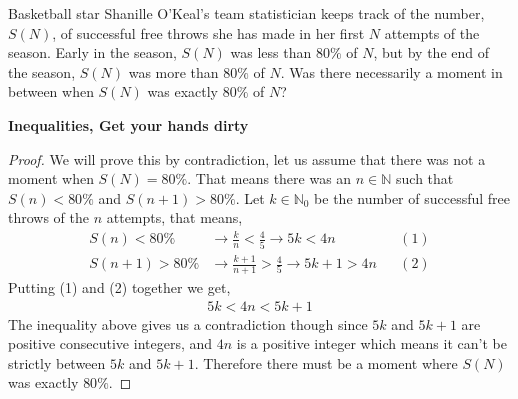 \documentclass[11pt]{article}
\newenvironment{problem}[2][Problem\!]{\begin{trivlist}
\item[\hskip \labelsep {\bfseries #1}\hskip \labelsep {\bfseries #2}]}{\end{trivlist}}
\newcommand{\nn}{\mathbb N}   %
\begin{document}
\begin{tcolorbox}
    \begin{problem} {IC | 12/01 | PP 36}
        Basketball star Shanille O'Keal's team statistician keeps track of the number, $S(N)$, of successful free throws she has made in her first $N$ attempts of the season. Early in the season, $S(N)$ was less than $80\%$ of $N$, but by the end of the season, $S(N)$ was more than $80\%$ of $N$. Was there necessarily a moment in between when $S(N)$ was exactly $80\%$ of $N$?
    \end{problem}
    \textbf{Inequalities, Get your hands dirty}
\end{tcolorbox}
\begin{proof}
    We will prove this by contradiction, let us assume that there was not a moment when $S(N) = 80\%$. That means there was an $n \in \nn$ such that $S(n) < 80\%$ and $S(n +1) > 80\%$. Let $k\in \nn_0$ be the number of successful free throws of the $n$ attempts, that means,
    \begin{align*}
        S(n) < 80\% &\rightarrow \frac{k}{n} < \frac{4}{5} \rightarrow 5k < 4n &&(1)\\
        S(n+1) > 80\% &\rightarrow \frac{k+1}{n+1} > \frac{4}{5} \rightarrow  5k +1 > 4n && (2) 
    \end{align*}
    Putting (1) and (2) together we get,
    \begin{align*}
        5k < 4n < 5k+1
    \end{align*}
    The inequality above gives us a contradiction though since $5k$ and $5k+1$ are positive consecutive integers, and $4n$ is a positive integer which means it can't be strictly between $5k$ and $5k +1$. Therefore there must be a moment where $S(N)$ was exactly $80 \%$.
\end{proof}
\end{document}
